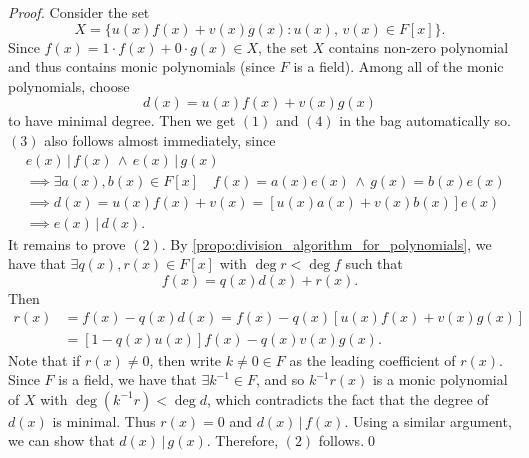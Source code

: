 \begin{proof}
  Consider the set
  \begin{equation*}
    X = \{ u(x) f(x) + v(x) g(x) : u(x), \, v(x) \in F[x] \}.
  \end{equation*}
  Since $f(x) = 1 \cdot f(x) + 0 \cdot g(x) \in X$, the set $X$ contains non-zero polynomial and thus contains monic polynomials (since $F$ is a field). Among all of the monic polynomials, choose
  \begin{equation*}
    d(x) = u(x) f(x) + v(x) g(x)
  \end{equation*}
  to have minimal degree. Then we get $(1)$ and $(4)$ in the bag automatically so. $(3)$ also follows almost immediately, since
  \begin{align*}
    &e(x) \, | \, f(x) \, \land \, e(x) \, | \, g(x) \\
    &\implies \exists a(x), b(x) \in F[x] \quad f(x) = a(x) e(x) \, \land \, g(x) = b(x) e(x) \\
    &\implies d(x) = u(x) f(x) + v(x) = [ u(x) a(x) + v(x) b(x) ] e(x) \\
    &\implies e(x) \, | \, d(x).
  \end{align*}
  It remains to prove $(2)$. By \cref{propo:division_algorithm_for_polynomials}, we have that $\exists q(x), r(x) \in F[x]$ with $\deg r < \deg f$ such that
  \begin{equation*}
    f(x) = q(x) d(x) + r(x).
  \end{equation*}
  Then
  \begin{align*}
    r(x) &= f(x) - q(x) d(x) = f(x) - q(x) [ u(x) f(x) + v(x) g(x) ] \\
         &= [ 1 - q(x) u(x) ] f(x) - q(x) v(x) g(x).
  \end{align*}
  Note that if $r(x) \neq 0$, then write $k \neq 0 \in F$ as the leading coefficient of $r(x)$. Since $F$ is a field, we have that $\exists k^{-1} \in F$, and so $k^{-1} r(x)$ is a monic polynomial of $X$ with $\deg( k^{-1} r ) < \deg d$, which contradicts the fact that the degree of $d(x)$ is minimal. Thus $r(x) = 0$ and $d(x) \, | \, f(x)$. Using a similar argument, we can show that $d(x) \, | \, g(x)$. Therefore, $(2)$ follows.\qed
\end{proof}



